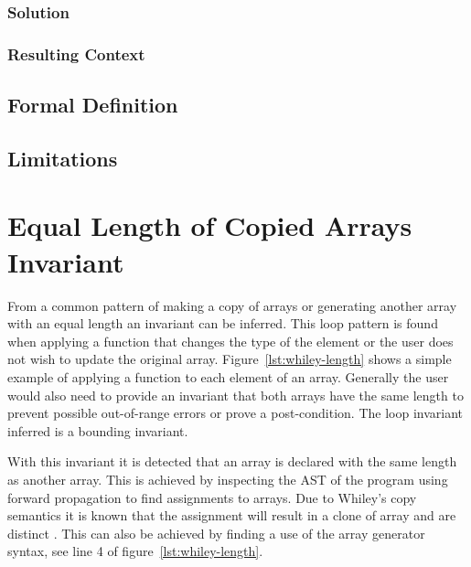 \subsubsection{Solution}
\subsubsection{Resulting Context}

\subsection{Formal Definition}

\subsection{Limitations}

\section{Equal Length of Copied Arrays Invariant}


From a common pattern of making a copy of arrays or generating another array
with an equal length an invariant can be inferred.
This loop pattern is found when applying a function that changes the type of
the element or the user does not wish to update the original array.
Figure~\ref{lst:whiley-length} shows a simple example of applying a function
 to each element of an array.
Generally the user would also need to provide an invariant that both arrays
have the same length to prevent possible out-of-range errors or prove a
post-condition.
The loop invariant inferred is a bounding invariant.



With this invariant it is detected that an array is declared with the same
length as another array.
This is achieved by inspecting the AST of the program
using forward propagation to find assignments to arrays.
Due to Whiley's copy semantics it is known that the assignment will result
in a clone of array and are distinct \cite{whiley-origin} \cite{whiley-arrays}.
This can also be achieved by finding a use of the array
generator syntax, see line 4 of figure~\ref{lst:whiley-length}.

